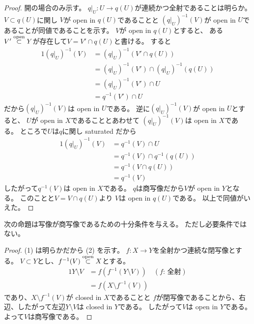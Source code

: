 \documentclass[report]{jlreq}
\begin{document}
\begin{proof}
    開の場合のみ示す。
    $q|_U \colon U \to q(U)$が連続かつ全射であることは明らか。
    $V \subset q(U)$に関し
    $V$が open in $q(U)$であることと
    $(q|_U)^{-1}(V)$が open in $U$であることが同値であることを示す。
    $V$が open in $q(U)$とすると、
    ある$V' \stackrel{\text{open}}{\subset} Y$が存在して$V = V' \cap q(U)$と書ける。
    すると
    \begin{alignat}{1}
        (q|_U)^{-1}(V)
            &= (q|_U)^{-1}(V' \cap q(U)) \\
            &= (q|_U)^{-1}(V') \cap (q|_U)^{-1}(q(U)) \\
            &= (q|_U)^{-1}(V') \cap U \\
            &= q^{-1}(V') \cap U
    \end{alignat}
    だから$(q|_U)^{-1}(V)$は open in $U$である。
    逆に$(q|_U)^{-1}(V)$が open in $U$とすると、
    $U$が open in $X$であることとあわせて
    $(q|_U)^{-1}(V)$は open in $X$である。
    ところで$U$は$q$に関し saturated だから
    \begin{alignat}{1}
        (q|_U)^{-1}(V)
            &= q^{-1}(V) \cap U \\
            &= q^{-1}(V) \cap q^{-1}(q(U)) \\
            &= q^{-1}(V \cap q(U)) \\
            &= q^{-1}(V)
    \end{alignat}
    したがって$q^{-1}(V)$は open in $X$である。
    $q$は商写像だから$V$が open in $Y$となる。
    このことと$V = V \cap q(U)$より
    $V$は open in $q(U)$である。
    以上で同値がいえた。
\end{proof}

次の命題は写像が商写像であるための十分条件を与える。
ただし必要条件ではない。


\begin{proof}
    (1) は明らかだから (2) を示す。
    $f \colon X \to Y$を全射かつ連続な閉写像とする。
    $V \subset Y$とし、$f^{-1}(V) \stackrel{\text{open}}{\subset} X$とする。
    \begin{alignat}{1}
        Y \setminus V
            &= f(f^{-1}(Y \setminus V)) \quad (\text{$f$: 全射}) \\
            &= f(X \setminus f^{-1}(V))
    \end{alignat}
    であり、$X \setminus f^{-1}(V)$が closed in $X$であることと
    $f$が閉写像であることから、右辺、したがって左辺$Y \setminus V$は closed in $Y$である。
    したがって$V$は open in $Y$である。
    よって$V$は商写像である。
\end{proof}
\end{document}
